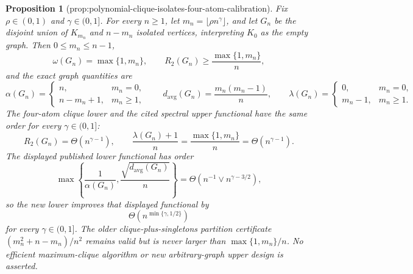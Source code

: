 \documentclass{article}
\newtheorem{proposition}{Proposition}
\begin{document}
\begin{proposition}[prop:polynomial-clique-isolates-four-atom-calibration]\label{prop:polynomial-clique-isolates-four-atom-calibration}
Fix \(\rho\in(0,1)\) and \(\gamma\in(0,1]\).  For every \(n\geq1\), let \(m_n=\lfloor\rho n^{\gamma}\rfloor\), and let \(G_n\) be the disjoint union of \(K_{m_n}\) and \(n-m_n\) isolated vertices, interpreting \(K_0\) as the empty graph.  Then \(0\leq m_n\leq n-1\),
\[
\omega(G_n)=\max\{1,m_n\},
\qquad
R_2(G_n)\geq\frac{\max\{1,m_n\}}n,
\]
and the exact graph quantities are
\[
\alpha(G_n)=
\begin{cases}
n,&m_n=0,\\
n-m_n+1,&m_n\geq1,
\end{cases}
\qquad
d_{\mathrm{avg}}(G_n)=\frac{m_n(m_n-1)}n,
\qquad
\lambda(G_n)=
\begin{cases}
0,&m_n=0,\\
m_n-1,&m_n\geq1.
\end{cases}
\]
The four-atom clique lower and the cited spectral upper functional have the same order for every \(\gamma\in(0,1]\):
\[
R_2(G_n)=\Theta(n^{\gamma-1}),
\qquad
\frac{\lambda(G_n)+1}{n}
=\frac{\max\{1,m_n\}}n
=\Theta(n^{\gamma-1}).
\]
The displayed published lower functional has order
\[
\max\left\{\frac1{\alpha(G_n)},
\frac{\sqrt{d_{\mathrm{avg}}(G_n)}}n\right\}
=\Theta\!\left(n^{-1}\vee n^{\gamma-3/2}\right),
\]
so the new lower improves that displayed functional by
\[
\Theta\!\left(n^{\min\{\gamma,1/2\}}\right)
\]
for every \(\gamma\in(0,1]\).  The older clique-plus-singletons partition certificate \((m_n^2+n-m_n)/n^2\) remains valid but is never larger than \(\max\{1,m_n\}/n\).  No efficient maximum-clique algorithm or new arbitrary-graph upper design is asserted.
\end{proposition}
\end{document}
